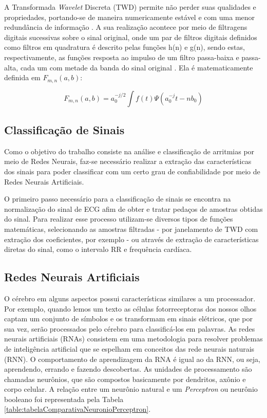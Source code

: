 \documentclass[conference]{IEEEtran}
\begin{document}
A Transformada \textit{Wavelet} Discreta (TWD) permite não perder suas qualidades e propriedades, portando-se de maneira numericamente estável e com uma menor redundância de informação \cite{silva06}. A sua realização acontece por meio de filtragens digitais sucessivas sobre o sinal
original, onde um par de filtros digitais definidos como filtros em quadratura é descrito pelas funções h(n) e g(n), sendo estas, respectivamente, as funções resposta ao impulso de um filtro passa-baixa e passa-alta, cada um com metade da banda do sinal original \cite{castelano06}. Ela é matematicamente definida em $F_{m,n}(a,b)$:

\[ 	F_{m,n}(a,b) = a_{0}^{-j/2}\int f(t)\Psi (a_{0}^{-j}t - nb_{0}) \]

\subsection{Classificação de Sinais}
Como o objetivo do trabalho consiste na análise e classificação de arritmias por meio de Redes Neurais, faz-se necessário realizar a extração das características dos sinais para poder classificar com um certo grau de confiabilidade por meio de Redes Neurais Artificiais.

O primeiro passo necessário para a classificação de sinais se encontra na normalização do sinal de ECG afim de obter e tratar pedaços de amostras obtidas do sinal. Para realizar esse processo utilizam-se diversos tipos de funções matemáticas, selecionando as amostras filtradas - por janelamento de TWD com extração dos coeficientes, por exemplo - ou através de extração de características diretas do sinal, como o intervalo RR e frequência cardíaca.

\subsection{Redes Neurais Artificiais}

O cérebro em alguns aspectos possui características similares a um processador. Por exemplo, quando lemos um texto as células fotorreceptoras dos nossos olhos captam um conjunto de símbolos e os transformam em sinais elétricos, que por sua vez, serão processados pelo cérebro para classificá-los em palavras. As redes neurais artificiais (RNAs) consistem em uma metodologia para resolver problemas de inteligência artificial que se espelham em conceitos das rede neurais naturais (RNN). O comportamento de aprendizagem da RNA é igual ao da RNN, ou seja, aprendendo, errando e fazendo descobertas. As unidades de processamento são chamadas neurônios, que são compostos basicamente por dendritos, axônio e corpo celular. A relação entre um neurônio natural e um \textit{Perceptron} ou neurônio booleano foi representada pela Tabela \ref{table:tabelaComparativaNeuronioPerceptron}.
\end{document}
